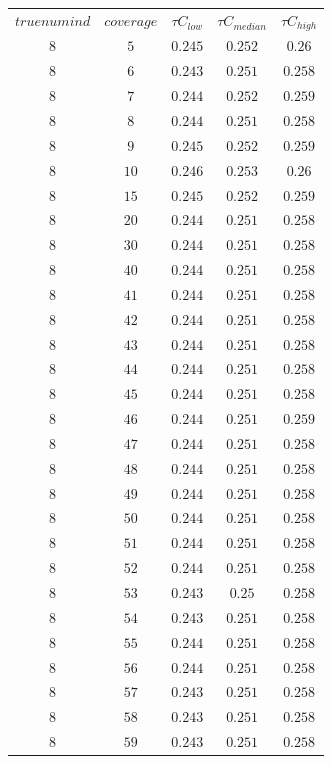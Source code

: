 \begin{table}[H]
\begin{tabular}{ccccc}
$truenumind$ & $coverage$ & ${\tau}C_{low}$ & ${\tau}C_{median}$ & ${\tau}C_{high}$\\
$8$ & $5$ & $0.245$ & $0.252$ & $0.26$\\
$8$ & $6$ & $0.243$ & $0.251$ & $0.258$\\
$8$ & $7$ & $0.244$ & $0.252$ & $0.259$\\
$8$ & $8$ & $0.244$ & $0.251$ & $0.258$\\
$8$ & $9$ & $0.245$ & $0.252$ & $0.259$\\
$8$ & $10$ & $0.246$ & $0.253$ & $0.26$\\
$8$ & $15$ & $0.245$ & $0.252$ & $0.259$\\
$8$ & $20$ & $0.244$ & $0.251$ & $0.258$\\
$8$ & $30$ & $0.244$ & $0.251$ & $0.258$\\
$8$ & $40$ & $0.244$ & $0.251$ & $0.258$\\
$8$ & $41$ & $0.244$ & $0.251$ & $0.258$\\
$8$ & $42$ & $0.244$ & $0.251$ & $0.258$\\
$8$ & $43$ & $0.244$ & $0.251$ & $0.258$\\
$8$ & $44$ & $0.244$ & $0.251$ & $0.258$\\
$8$ & $45$ & $0.244$ & $0.251$ & $0.258$\\
$8$ & $46$ & $0.244$ & $0.251$ & $0.259$\\
$8$ & $47$ & $0.244$ & $0.251$ & $0.258$\\
$8$ & $48$ & $0.244$ & $0.251$ & $0.258$\\
$8$ & $49$ & $0.244$ & $0.251$ & $0.258$\\
$8$ & $50$ & $0.244$ & $0.251$ & $0.258$\\
$8$ & $51$ & $0.244$ & $0.251$ & $0.258$\\
$8$ & $52$ & $0.244$ & $0.251$ & $0.258$\\
$8$ & $53$ & $0.243$ & $0.25$ & $0.258$\\
$8$ & $54$ & $0.243$ & $0.251$ & $0.258$\\
$8$ & $55$ & $0.244$ & $0.251$ & $0.258$\\
$8$ & $56$ & $0.244$ & $0.251$ & $0.258$\\
$8$ & $57$ & $0.243$ & $0.251$ & $0.258$\\
$8$ & $58$ & $0.243$ & $0.251$ & $0.258$\\
$8$ & $59$ & $0.243$ & $0.251$ & $0.258$\\

\end{tabular}
\end{table}
